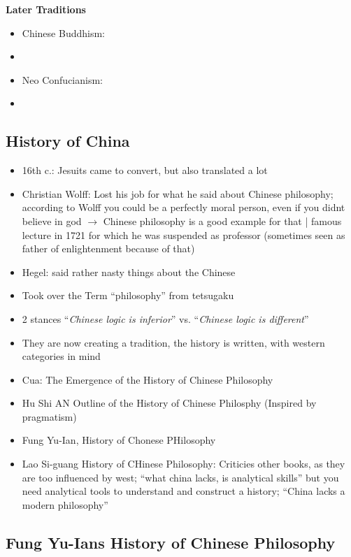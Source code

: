 \documentclass[emulatestandardclasses]{scrartcl}
\begin{document}
\textbf{Later Traditions}

\begin{itemize}
  \item Chinese Buddhism:
  \item 
  \item Neo Confucianism:
  \item 
\end{itemize}

\subsection{History of China}

\begin{itemize}
  \item 16th c.: Jesuits came to convert, but also translated a lot
  \item Christian Wolff: Lost his job for what he said about Chinese philosophy; according to Wolff you could be a perfectly moral person, even if you didnt believe in god $\rightarrow$ Chinese philosophy is a good example for that | famous lecture in 1721 for which he was suspended as professor (sometimes seen as father of enlightenment because of that)
  \item Hegel: said rather nasty things about the Chinese
  \item Took over the Term "`philosophy"' from tetsugaku
  \item 2 stances "`\emph{Chinese logic is inferior}"' vs. "`\emph{Chinese logic is different}"'
  \item They are now creating a tradition, the history is written, with western categories in mind
  \item Cua: The Emergence of the History of Chinese Philosophy
  \item Hu Shi AN Outline of the History of Chinese Philosphy (Inspired by pragmatism)
  \item Fung Yu-Ian, History of Chonese PHilosophy
  \item Lao Si-guang History of CHinese Philosophy: Criticies other books, as they are too influenced by west;  "`what china lacks, is analytical skills"' but you need analytical tools to understand and construct a history; "`China lacks a modern philosophy"'
\end{itemize}


\subsection{Fung Yu-Ians History of Chinese Philosophy}
\end{document}

